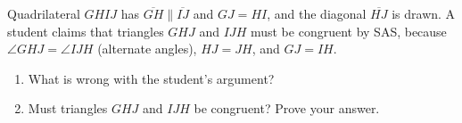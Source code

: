 Quadrilateral $GHIJ$ has $\overline{GH}\parallel\overline{IJ}$ and $GJ=HI$, and the diagonal $\overline{HJ}$ is drawn. A student claims that triangles $GHJ$ and $IJH$ must be congruent by SAS, because $\angle GHJ=\angle IJH$ (alternate angles), $HJ=JH$, and $GJ=IH$.
\begin{enumerate}
\item[(a)] What is wrong with the student's argument?
\item[(b)] Must triangles $GHJ$ and $IJH$ be congruent? Prove your answer.
\end{enumerate}
